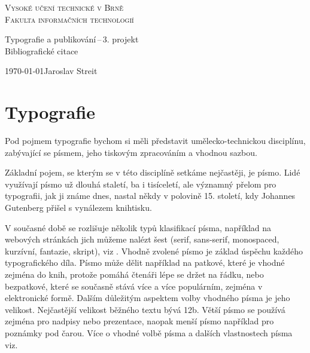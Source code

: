\documentclass[11pt,a4paper]{article}
\begin{document}
\begin{titlepage}
    \begin{center}
        \Huge
        \textsc{
        Vysoké učení technické v Brně\\[-0,2cm]
        \huge
        Fakulta informačních technologií}\\
        \end{center}
        \begin{center}
        \LARGE
        Typografie a publikování\,--\,3. projekt\\
        \Huge
        Bibliografické citace
    
    {\Large \today \hfill Jaroslav Streit}
    \end{center}
    
\end{titlepage}
\section{Typografie}

Pod pojmem typografie bychom si měli představit umělecko-technickou disciplínu, zabývající se písmem, jeho tiskovým zpracováním a vhodnou sazbou\cite{Knytl2020}.

Základní pojem, se kterým se v této disciplíně setkáme nejčastěji, je písmo. Lidé využívají písmo už dlouhá staletí, ba i tisíceletí, ale významný přelom pro typografii, jak ji známe dnes, nastal někdy v polovině 15. století, kdy Johannes Gutenberg přišel s vynálezem knihtisku\cite{berger1996johann}.

V současné době se rozlišuje několik typů klasifikací písma, například na webových stránkách jich můžeme nalézt šest (serif, sans-serif, monospaced, kurzívní, fantazie, skript), viz \cite{Kyrnin2017}. Vhodně zvolené písmo je základ úspěchu každého typografického díla. Písmo může dělit například na patkové, které je vhodné zejména do knih, protože pomáhá čtenáři lépe se držet na řádku\cite{arditi2005serifs}, nebo bezpatkové, které se současně stává více a více populárním, zejména v elektronické formě. Dalším důležitým aspektem volby vhodného písma je jeho velikost. Nejčastější velikost běžného textu bývá 12b. Větší písmo se používá zejména pro nadpisy nebo prezentace, naopak menší písmo například pro poznámky pod čarou. Více o vhodné volbě písma a dalších vlastnostech písma viz\cite{Cvingrafova2011}. 
\end{document}
